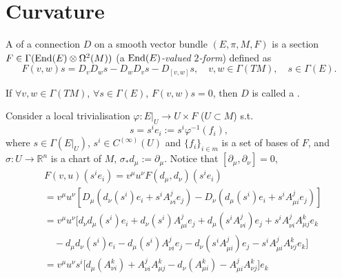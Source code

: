\documentclass[openany, oneside, a5paper]{book}
\begin{document}
\chapter{Curvature}

\begin{definition}[Curvature]
    A  of a connection $D$ on a smooth vector bundle $(E, \pi, M, F)$ is a section $F \in \Gamma(\operatorname{End}(E) \otimes \Omega^2(M))$ (a \emph{$\operatorname{End}(E)$-valued $2$-form}) defined as
    \begin{equation}
        F(v, w) s = D_v D_w s - D_w D_v s - D_{[v, w]} s,
        \quad
        v, w \in \Gamma(TM),
        \quad
        s \in \Gamma(E).
    \end{equation} 
\end{definition}

If $\forall v, w \in \Gamma(TM)$, $\forall s \in \Gamma(E)$, $F(v, w) s = 0$, then $D$ is called a .

Consider a local trivialisation $\varphi \colon E|_U \to U \times F$ ($U \subset M$) s.t.\ 
\begin{equation}
    s = s^i e_i := s^i\varphi^{-1}(f_i),
\end{equation}
where $s \in \Gamma(E|_U)$, $s^i \in C^{(\infty)}(U)$ and $\{f_i\}_{i \in m}$ is a set of bases of $F$,
and $\sigma \colon U \to \mathbb R^n$ is a chart of $M$, $\sigma_* d_\mu := \partial_\mu$.
Notice that $[\partial_\mu, \partial_\nu] = 0$,
\begin{equation}
    \begin{aligned}
        &F(v, u) (s^i e_i) 
        = v^\mu u^\nu F(d_\mu, d_\nu) (s^i e_i)
        \\
        &= v^\mu u^\nu [
            D_\mu (d_\nu(s^i)e_i + s^i A_{\nu i}^j e_j)
            - D_\nu (d_\mu(s^i)e_i + s^i A_{\mu i}^j e_j)
        ]
        \\
        &= v^\mu u^\nu \big[
            d_\nu d_\mu (s^i) e_i + d_\nu (s^i) A_{\mu i}^j e_j
            + d_\mu(s^i A_{\nu i}^j) e_j + s^i A_{\nu i}^j A_{\mu j}^k e_k
        \\
        &\quad
        - d_\mu d_\nu(s^i) e_i - d_\mu(s^i) A_{\nu i}^j e_j
        - d_\nu(s^i A_{\mu i}^j) e_j - s^i A_{\mu i}^j A_{\nu j}^k e_k
        \big]
        \\
        &= v^\mu u^\nu s^i\big[ 
            d_\mu (A_{\nu i}^k) + A_{\nu i}^j A_{\mu j}^k
            - d_\nu (A_{\mu i}^k) - A_{\mu i}^j A_{\nu j}^k 
        \big] e_k
    \end{aligned}
\end{equation}
\end{document}
